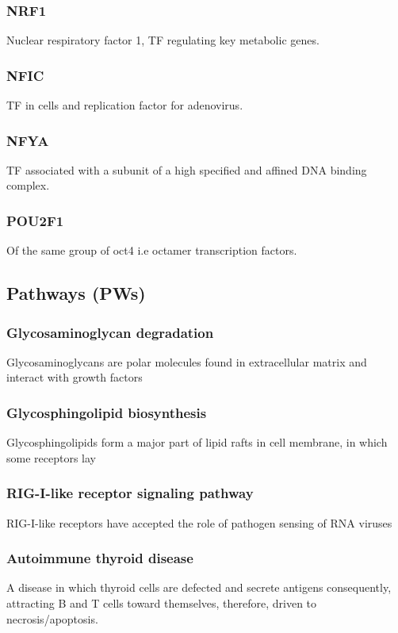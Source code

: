 \documentclass[3p,authoryear,preprint,12pt]{elsarticle}
\begin{document}
\subsubsection{NRF1}Nuclear respiratory factor 1, TF regulating key metabolic genes.

\subsubsection{NFIC}TF in cells and replication factor for adenovirus. 

\subsubsection{NFYA}TF associated with a subunit of a high specified and affined DNA binding complex.

\subsubsection{POU2F1}Of the same group of oct4 i.e octamer transcription factors.

\subsection{Pathways (PWs)}

\subsubsection{Glycosaminoglycan degradation}
Glycosaminoglycans are polar molecules found in extracellular matrix and interact with growth factors%

\subsubsection{Glycosphingolipid biosynthesis}
Glycosphingolipids form a major part of lipid rafts in cell membrane, in which some receptors lay %

\subsubsection{RIG-I-like receptor signaling pathway}
RIG-I-like receptors have accepted the role of pathogen sensing of RNA viruses %

\subsubsection{Autoimmune thyroid disease}
A disease in which thyroid cells are defected and secrete antigens consequently, attracting B and T cells toward themselves, therefore, driven to necrosis/apoptosis. %
\end{document}
